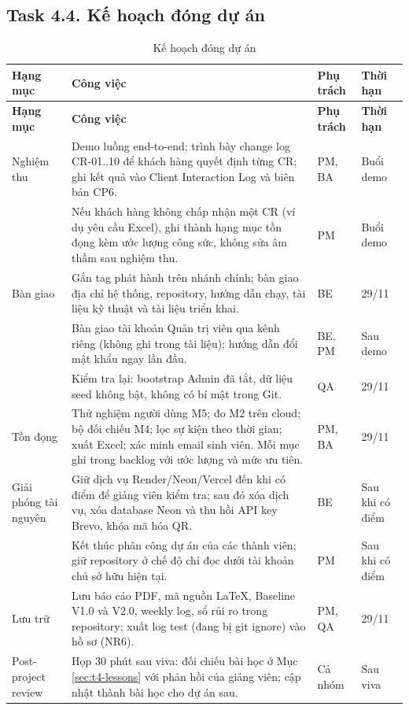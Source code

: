 \subsection{Task 4.4. Kế hoạch đóng dự án}
\label{sec:t4-closure}

\begingroup\small
\renewcommand{\arraystretch}{1.15}
\begin{longtable}{@{}p{.17\linewidth}p{.50\linewidth}p{.11\linewidth}p{.12\linewidth}@{}}
\caption{Kế hoạch đóng dự án}\label{tab:t4-closure}\\
\toprule
\textbf{Hạng mục} & \textbf{Công việc} & \textbf{Phụ trách} & \textbf{Thời hạn}\\\midrule\endfirsthead
\toprule
\textbf{Hạng mục} & \textbf{Công việc} & \textbf{Phụ trách} & \textbf{Thời hạn}\\\midrule\endhead
\bottomrule\endfoot
Nghiệm thu & Demo luồng end-to-end; trình bày change log CR-01..10 để khách hàng quyết định từng CR; ghi kết quả vào Client Interaction Log và biên bản CP6. & PM, BA & Buổi demo\\
 & Nếu khách hàng không chấp nhận một CR (ví dụ yêu cầu Excel), ghi thành hạng mục tồn đọng kèm ước lượng công sức, không sửa âm thầm sau nghiệm thu. & PM & Buổi demo\\
Bàn giao & Gắn tag phát hành trên nhánh chính; bàn giao địa chỉ hệ thống, repository, hướng dẫn chạy, tài liệu kỹ thuật và tài liệu triển khai. & BE & 29/11\\
 & Bàn giao tài khoản Quản trị viên qua kênh riêng (không ghi trong tài liệu); hướng dẫn đổi mật khẩu ngay lần đầu. & BE, PM & Sau demo\\
 & Kiểm tra lại: bootstrap Admin đã tắt, dữ liệu seed không bật, không có bí mật trong Git. & QA & 29/11\\
Tồn đọng & Thử nghiệm người dùng M5; đo M2 trên cloud; bộ đối chiếu M4; lọc sự kiện theo thời gian; xuất Excel; xác minh email sinh viên. Mỗi mục ghi trong backlog với ước lượng và mức ưu tiên. & PM, BA & 29/11\\
Giải phóng tài nguyên & Giữ dịch vụ Render/Neon/Vercel đến khi có điểm để giảng viên kiểm tra; sau đó xóa dịch vụ, xóa database Neon và thu hồi API key Brevo, khóa mã hóa QR. & BE & Sau khi có điểm\\
 & Kết thúc phân công dự án của các thành viên; giữ repository ở chế độ chỉ đọc dưới tài khoản chủ sở hữu hiện tại. & PM & Sau khi có điểm\\
Lưu trữ & Lưu báo cáo PDF, mã nguồn LaTeX, Baseline V1.0 và V2.0, weekly log, sổ rủi ro trong repository; xuất log test (đang bị git ignore) vào hồ sơ (NR6). & PM, QA & 29/11\\
Post-project review & Họp 30 phút sau viva: đối chiếu bài học ở Mục \ref{sec:t4-lessons} với phản hồi của giảng viên; cập nhật thành bài học cho dự án sau. & Cả nhóm & Sau viva\\
\end{longtable}
\endgroup
